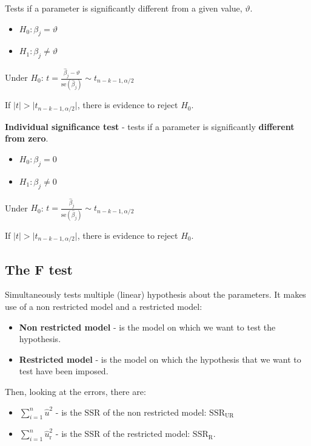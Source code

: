 \documentclass[10pt, a4paper, landscape]{extarticle}
\newcommand{\se}{\mathrm{se}}
\newcommand{\SSR}{\mathrm{SSR}}
\begin{document}
\begin{multicols}{3}
Tests if a parameter is significantly different from a given value, $\vartheta$.

\begin{itemize}[leftmargin=*]
	\item $H_0: \beta_j = \vartheta$
	\item $H_1: \beta_j \neq \vartheta$
\end{itemize}

\begin{center}
	Under $H_0$: \quad $t = \frac{\hat{\beta}_j - \vartheta}{\se(\hat{\beta}_j)} \sim t_{n - k - 1, \alpha/2}$
\end{center}

If $\lvert t \rvert > \lvert t_{n - k - 1, \alpha/2} \rvert$, there is evidence to reject $H_0$.

\textbf{Individual significance test} - tests if a parameter is significantly \textbf{different from zero}.

\begin{itemize}[leftmargin=*]
	\item $H_0: \beta_j = 0$
	\item $H_1: \beta_j \neq 0$
\end{itemize}

\begin{center}
	Under $H_0$: \quad $t = \frac{\hat{\beta}_j}{\se(\hat{\beta}_j)} \sim t_{n - k - 1, \alpha/2}$
\end{center}

If $\lvert t \rvert > \lvert t_{n - k - 1, \alpha/2} \rvert$, there is evidence to reject $H_0$.

\subsection*{The F test}

Simultaneously tests multiple (linear) hypothesis about the parameters. It makes use of a non restricted model and a restricted model:

\begin{itemize}[leftmargin=*]
	\item \textbf{Non restricted model} - is the model on which we want to test the hypothesis.
	\item \textbf{Restricted model} - is the model on which the hypothesis that we want to test have been imposed.
\end{itemize}

Then, looking at the errors, there are:

\begin{itemize}[leftmargin=*]
	\item \textbf{$\sum_{i=1}^n \hat{u}^2$} - is the $\SSR$ of the non restricted model: $\SSR_\mathrm{UR}$
	\item \textbf{$\sum_{i=1}^n \hat{u}_\mathrm{r}^2$} - is the $\SSR$ of the restricted model: $\SSR_\mathrm{R}$.
\end{itemize}


\end{multicols}
\end{document}
